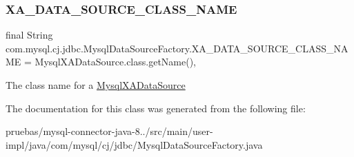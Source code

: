 \subsubsection{\texorpdfstring{X\+A\+\_\+\+D\+A\+T\+A\+\_\+\+S\+O\+U\+R\+C\+E\+\_\+\+C\+L\+A\+S\+S\+\_\+\+N\+A\+ME}{XA\_DATA\_SOURCE\_CLASS\_NAME}}
{\footnotesize\ttfamily final String com.\+mysql.\+cj.\+jdbc.\+Mysql\+Data\+Source\+Factory.\+X\+A\+\_\+\+D\+A\+T\+A\+\_\+\+S\+O\+U\+R\+C\+E\+\_\+\+C\+L\+A\+S\+S\+\_\+\+N\+A\+ME = Mysql\+X\+A\+Data\+Source.\+class.\+get\+Name()\hspace{0.3cm}{\ttfamily [static]}, {\ttfamily [protected]}}

The class name for a \mbox{\hyperlink{classcom_1_1mysql_1_1cj_1_1jdbc_1_1_mysql_x_a_data_source}{Mysql\+X\+A\+Data\+Source}} 

The documentation for this class was generated from the following file\+:\begin{DoxyCompactItemize}
\item 
pruebas/mysql-\/connector-\/java-\/8../src/main/user-\/impl/java/com/mysql/cj/jdbc/Mysql\+Data\+Source\+Factory.\+java\end{DoxyCompactItemize}
